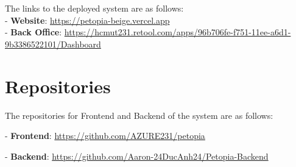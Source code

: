 The links to the deployed system are as follows:\\
- \textbf{Website}: \url{https://petopia-beige.vercel.app}\\
- \textbf{Back Office}: \url{https://hcmut231.retool.com/apps/96b706fe-f751-11ee-a6d1-9b3386522101/Dashboard}
\section{Repositories}

The repositories for Frontend and Backend of the system are as follows:

- \textbf{Frontend}: \url{https://github.com/AZURE231/petopia}

- \textbf{Backend}: \url{https://github.com/Aaron-24DucAnh24/Petopia-Backend}
